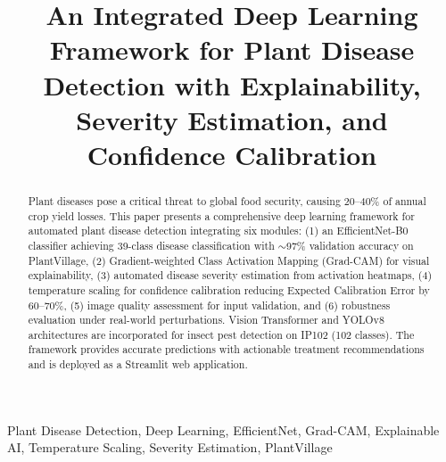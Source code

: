 \documentclass[conference]{IEEEtran}
\begin{document}
\title{An Integrated Deep Learning Framework for Plant Disease Detection with Explainability, Severity Estimation, and Confidence Calibration}

\author{
\and
{}
\and
{}
}

\maketitle

\begin{abstract}
Plant diseases pose a critical threat to global food security, causing 20--40\% of annual crop yield losses. This paper presents a comprehensive deep learning framework for automated plant disease detection integrating six modules: (1) an EfficientNet-B0 classifier achieving 39-class disease classification with $\sim$97\% validation accuracy on PlantVillage, (2) Gradient-weighted Class Activation Mapping (Grad-CAM) for visual explainability, (3) automated disease severity estimation from activation heatmaps, (4) temperature scaling for confidence calibration reducing Expected Calibration Error by 60--70\%, (5) image quality assessment for input validation, and (6) robustness evaluation under real-world perturbations. Vision Transformer and YOLOv8 architectures are incorporated for insect pest detection on IP102 (102 classes). The framework provides accurate predictions with actionable treatment recommendations and is deployed as a Streamlit web application.
\end{abstract}

\begin{IEEEkeywords}
Plant Disease Detection, Deep Learning, EfficientNet, Grad-CAM, Explainable AI, Temperature Scaling, Severity Estimation, PlantVillage
\end{IEEEkeywords}
\end{document}
